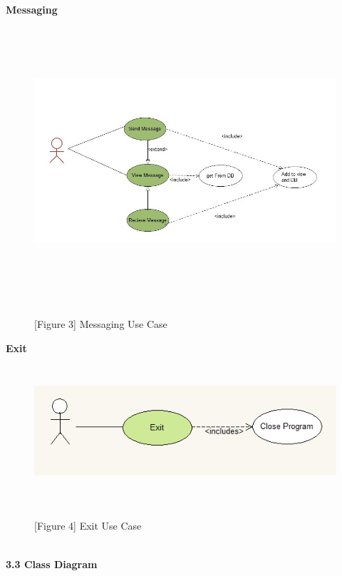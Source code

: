 \documentclass[29pt,a4paper]{moderncv}
\begin{document}
		\noindent \left\textbf{Messaging}\\
		\begin{figure}
			\centering
			\\ \includegraphics[width=6.0in, height=3.5in]{./messagingUseCase.jpg}
			\\\caption{[Figure 3] Messaging Use Case}\\
		\end{figure}
\newpage		
		\noindent \left\textbf{Exit}\\
		\begin{figure}
			\centering
			\\ \includegraphics[width=6.0in, height=1.5in]{./exitCase.png}
			\\\caption{[Figure 4] Exit Use Case}\\
		\end{figure}
\newpage	
	\noindent \\ \left\textbf{3.3 Class Diagram}\\
\end{document}
